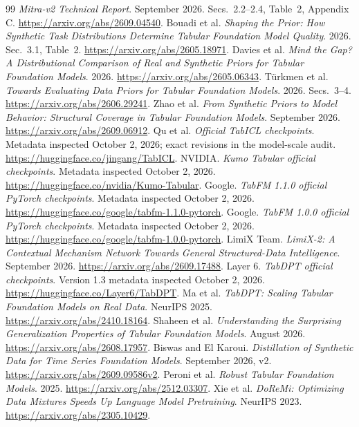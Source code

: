 \documentclass[11pt]{article}
\begin{document}
\begin{thebibliography}{99}
 \emph{Mitra-v2 Technical Report}. September 2026. Secs.\ 2.2--2.4, Table\ 2, Appendix C. \url{https://arxiv.org/abs/2609.04540}.
 Bouadi et al. \emph{Shaping the Prior: How Synthetic Task Distributions Determine Tabular Foundation Model Quality}. 2026. Sec.\ 3.1, Table\ 2. \url{https://arxiv.org/abs/2605.18971}.
 Davies et al. \emph{Mind the Gap? A Distributional Comparison of Real and Synthetic Priors for Tabular Foundation Models}. 2026. \url{https://arxiv.org/abs/2605.06343}.
 T\"urkmen et al. \emph{Towards Evaluating Data Priors for Tabular Foundation Models}. 2026. Secs.\ 3--4. \url{https://arxiv.org/abs/2606.29241}.
 Zhao et al. \emph{From Synthetic Priors to Model Behavior: Structural Coverage in Tabular Foundation Models}. September 2026. \url{https://arxiv.org/abs/2609.06912}.
 Qu et al. \emph{Official TabICL checkpoints}. Metadata inspected October 2, 2026; exact revisions in the model-scale audit. \url{https://huggingface.co/jingang/TabICL}.
 NVIDIA. \emph{Kumo Tabular official checkpoints}. Metadata inspected October 2, 2026. \url{https://huggingface.co/nvidia/Kumo-Tabular}.
 Google. \emph{TabFM 1.1.0 official PyTorch checkpoints}. Metadata inspected October 2, 2026. \url{https://huggingface.co/google/tabfm-1.1.0-pytorch}.
 Google. \emph{TabFM 1.0.0 official PyTorch checkpoints}. Metadata inspected October 2, 2026. \url{https://huggingface.co/google/tabfm-1.0.0-pytorch}.
 LimiX Team. \emph{LimiX-2: A Contextual Mechanism Network Towards General Structured-Data Intelligence}. September 2026. \url{https://arxiv.org/abs/2609.17488}.
 Layer 6. \emph{TabDPT official checkpoints}. Version 1.3 metadata inspected October 2, 2026. \url{https://huggingface.co/Layer6/TabDPT}.
 Ma et al. \emph{TabDPT: Scaling Tabular Foundation Models on Real Data}. NeurIPS 2025. \url{https://arxiv.org/abs/2410.18164}.
 Shaheen et al. \emph{Understanding the Surprising Generalization Properties of Tabular Foundation Models}. August 2026. \url{https://arxiv.org/abs/2608.17957}.
 Biswas and El Karoui. \emph{Distillation of Synthetic Data for Time Series Foundation Models}. September 2026, v2. \url{https://arxiv.org/abs/2609.09586v2}.
 Peroni et al. \emph{Robust Tabular Foundation Models}. 2025. \url{https://arxiv.org/abs/2512.03307}.
 Xie et al. \emph{DoReMi: Optimizing Data Mixtures Speeds Up Language Model Pretraining}. NeurIPS 2023. \url{https://arxiv.org/abs/2305.10429}.

\end{thebibliography}
\end{document}
